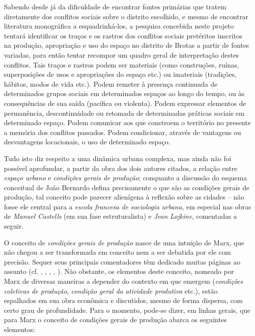 Sabendo desde já da dificuldade de encontrar fontes primárias que tratem diretamente dos conflitos sociais sobre o distrito escolhido, e mesmo de encontrar literatura monográfica a esquadrinhá-los, a pesquisa concebida neste projeto tentará identificar os traços e os rastros dos conflitos sociais pretéritos inscritos na produção, apropriação e uso do espaço no distrito de Brotas a partir de fontes variadas, para então tentar recompor um quadro geral de interpretação destes conflitos. Tais traços e rastros podem ser materiais (como construções, ruínas, superposições de usos e apropriações do espaço etc.) ou imateriais (tradições, hábitos, modos de vida etc.). Podem remeter à presença continuada de determinados grupos sociais em determinados espaços ao longo do tempo, ou às consequências de sua saída (pacífica ou violenta). Podem expressar elementos de permanência, descontinuidade ou retomada de determinadas práticas sociais em determinado espaço. Podem comunicar aos que constroem o território no presente a memória dos conflitos passados. Podem condicionar, através de vantagens ou desvantagens locacionais, o uso de determinado espaço. 

Tudo isto diz respeito a uma dinâmica urbana complexa, mas ainda não foi possível aprofundar, a partir da obra dos dois autores citados, a relação entre \textit{espaço urbano} e \textit{condições gerais de produção}; conquanto a discussão do esquema conceitual de João Bernardo defina precisamente o que são as condições gerais de produção, tal conceito pode parecer alienígena à reflexão sobre as cidades -- não fosse ele central para a \textit{escola francesa de sociologia urbana}, em especial nas obras de \textit{Manuel Castells} (em sua fase estruturalista) e \textit{Jean Lojkine}, comentadas a seguir.

O conceito de \textit{condições gerais de produção} nasce de uma intuição de Marx, que não chegou a ser transformada em conceito nem a ser debatida por ele com precisão. Sequer seus principais comentadores têm dedicado muitas páginas ao assunto (cf. , , , , ). Não obstante, os elementos deste conceito, nomeado por Marx de diversas maneiras a depender do contexto em que emergem (\textit{condições coletivas de produção}, \textit{condição geral da atividade produtiva} etc.), estão espalhados em sua obra econômica e discutidos, mesmo de forma dispersa, com certo grau de profundidade. Para o momento, pode-se dizer, em linhas gerais, que para Marx o conceito de condições gerais de produção abarca os seguintes elementos:

